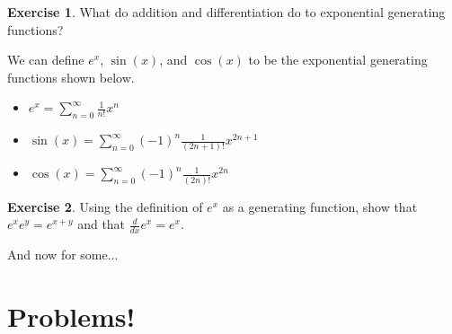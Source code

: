 \documentclass[11pt]{article}
\theoremstyle{definition}
\newtheorem*{exercise}{Exercise}
\begin{document}
\begin{exercise}
What do addition and differentiation do to exponential generating functions?
\end{exercise}

We can define $e^{x}$, $\sin(x)$, and $\cos(x)$ to be the exponential generating functions shown below.  
\begin{itemize}
  \item $e^{x}=\sum_{n=0}^\infty \frac{1}{n!}x^n$
  \item $\sin(x)=\sum_{n=0}^\infty (-1)^n\frac{1}{(2n+1)!}x^{2n+1}$
  \item $\cos(x)=\sum_{n=0}^\infty (-1)^n\frac{1}{(2n)!}x^{2n}$
\end{itemize}

\begin{exercise}
  Using the definition of $e^x$ as a generating function, show that $e^{x}e^{y}=e^{x+y}$ and that $\frac{d}{dx}e^{x}=e^x$.
\end{exercise}

And now for some...

\section*{Problems!}
\end{document}
